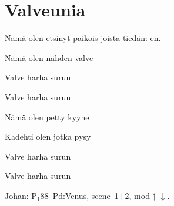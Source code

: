 \documentclass[12pt,a4paper]{article}
\begin{document}
\thispagestyle{empty}
\section*{Valveunia}

\begin{SBVerse}
Nämä  olen etsinyt  paikois joista tiedän:
 en.

Nämä  olen  nähden 
valve
\end{SBVerse}

\begin{SBChorus}
Valve harha surun 

Valve harha surun 
\end{SBChorus}

\begin{SBVerse*}
    
  
\end{SBVerse*}

\begin{SBVerse}
Nämä  olen  petty kyyne

Kadehti olen  jotka  pysy
\end{SBVerse}

\begin{SBChorus}
Valve harha surun 

Valve harha surun 
\end{SBChorus}


{\SBLyricNoteFont Johan: P\textsubscript{1}88~Pd:Venus, scene~1+2,
mod$\uparrow\downarrow$.}
\end{document}
